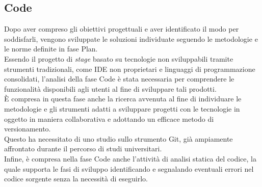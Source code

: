 \subsection{Code}
 Dopo aver compreso gli obiettivi progettuali e aver identificato il modo per soddisfarli, vengono sviluppate le soluzioni individuate seguendo le metodologie e le norme definite in fase Plan.\\
Essendo il progetto di \emph{stage} basato su tecnologie non sviluppabili tramite strumenti tradizionali, come IDE non proprietari e linguaggi di programmazione consolidati, l'analisi della fase Code è stata necessaria per comprendere le funzionalità disponibili agli utenti al fine di sviluppare tali prodotti.\\
È compresa in questa fase anche la ricerca avvenuta al fine di individuare le metodologie e gli strumenti adatti a sviluppare progetti con le tecnologie in oggetto in maniera collaborativa e adottando un efficace metodo di versionamento.\\
Questo ha necessitato di uno studio sullo strumento Git, già ampiamente affrontato durante il percorso di studi universitari.\\
Infine, è compresa nella fase Code anche l'attività di analisi statica del codice, la quale supporta le fasi di sviluppo identificando e segnalando eventuali errori nel codice sorgente senza la necessità di eseguirlo.

